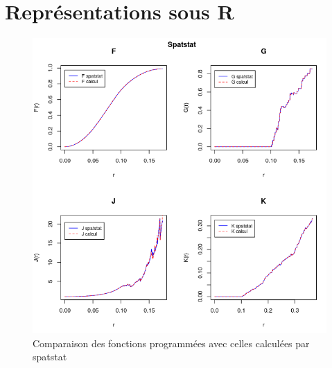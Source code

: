 \documentclass[stage2a]{tnreport}
\begin{document}
\newpage


\chapter{Représentations sous R}

\begin{center}
\begin{figure}[h]
  \centering
  \includegraphics[scale=0.7]{figures/calcul&spatstat.png}
  \caption{Comparaison des fonctions programmées avec celles calculées par spatstat }
  \label{fig:compSpatstat}
\end{figure}
\end{center}
\newpage
\end{document}

